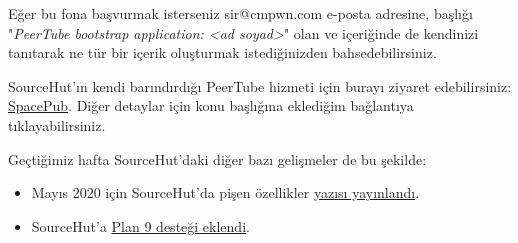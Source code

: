 \documentclass[11pt]{article}
\begin{document}
Eğer bu fona başvurmak isterseniz sir@cmpwn.com e-posta adresine, başlığı
"\emph{PeerTube bootstrap application: <ad soyad>}" olan ve içeriğinde de kendinizi
tanıtarak ne tür bir içerik oluşturmak istediğinizden bahsedebilirsiniz.

SourceHut'ın kendi barındırdığı PeerTube hizmeti için burayı ziyaret
edebilirsiniz: \href{https://spacepub.space/}{SpacePub}. Diğer detaylar için konu başlığına eklediğim
bağlantıya tıklayabilirsiniz.

Geçtiğimiz hafta SourceHut'daki diğer bazı gelişmeler de bu şekilde:
\begin{itemize}
\item Mayıs 2020 için SourceHut'da pişen özellikler \href{https://sourcehut.org/blog/2020-05-15-whats-cooking-may-2020/}{yazısı yayınlandı}.
\item SourceHut'a \href{https://sourcehut.org/blog/2020-05-11-sourcehut-plus-plan-9/}{Plan 9 desteği eklendi}.
\end{itemize}
\end{document}
